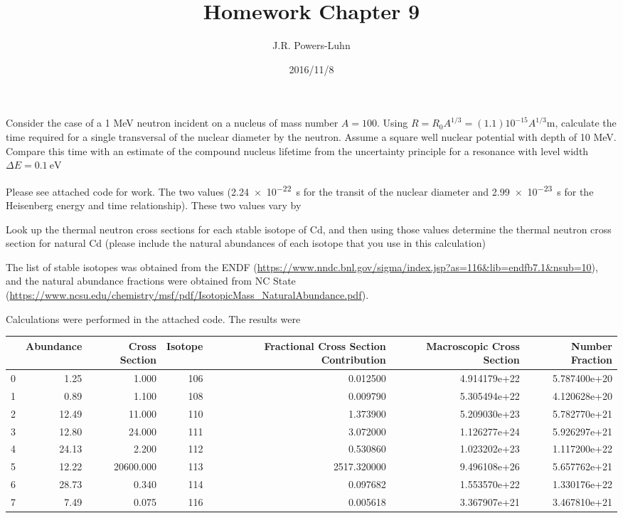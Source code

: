 \documentclass{hw}
\author{J.R. Powers-Luhn}
\date{2016/11/8}
\title{Homework Chapter 9}
\begin{document}
Consider the case of a 1 MeV neutron incident on a nucleus of mass number $A = 100$. Using $R=R_0 A^{1/3}=(1.1)10^{-15} A^{1/3}$m, calculate the time required for a single transversal of the nuclear diameter by the neutron. Assume a square well nuclear potential with depth of 10 MeV. Compare this time with an estimate of the compound nucleus lifetime from the uncertainty principle for a resonance with level width $\Delta E=\SI{0.1}{\electronvolt}$

\solution
Please see attached code for work. The two values (\SI{2.24e-22}{\second} for the transit of the nuclear diameter and \SI{2.99e-23}{\second} for the Heisenberg energy and time relationship). These two values vary by 

\problem{}
Look up the thermal neutron cross sections for each stable isotope of Cd, and then using those
values determine the thermal neutron cross section for natural Cd (please include the natural
abundances of each isotope that you use in this calculation)

\solution
The list of stable isotopes was obtained from the ENDF (\url{https://www.nndc.bnl.gov/sigma/index.jsp?as=116&lib=endfb7.1&nsub=10}), and the natural abundance fractions were obtained from NC State (\url{https://www.ncsu.edu/chemistry/msf/pdf/IsotopicMass_NaturalAbundance.pdf}).

Calculations were performed in the attached code. The results were

\begin{tabular}{lrrrrrr}
\toprule
{} &  Abundance &  Cross Section &  Isotope &  Fractional Cross Section Contribution &  Macroscopic Cross Section &  Number Fraction \\
\midrule
0 &       1.25 &          1.000 &      106 &                               0.012500 &               4.914179e+22 &     5.787400e+20 \\
1 &       0.89 &          1.100 &      108 &                               0.009790 &               5.305494e+22 &     4.120628e+20 \\
2 &      12.49 &         11.000 &      110 &                               1.373900 &               5.209030e+23 &     5.782770e+21 \\
3 &      12.80 &         24.000 &      111 &                               3.072000 &               1.126277e+24 &     5.926297e+21 \\
4 &      24.13 &          2.200 &      112 &                               0.530860 &               1.023202e+23 &     1.117200e+22 \\
5 &      12.22 &      20600.000 &      113 &                            2517.320000 &               9.496108e+26 &     5.657762e+21 \\
6 &      28.73 &          0.340 &      114 &                               0.097682 &               1.553570e+22 &     1.330176e+22 \\
7 &       7.49 &          0.075 &      116 &                               0.005618 &               3.367907e+21 &     3.467810e+21 \\
\bottomrule
\end{tabular}
\end{document}
